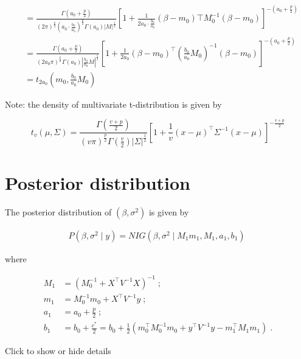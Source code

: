 \documentclass[
]{book}
\theoremstyle{definition}
\theoremstyle{definition}
\theoremstyle{definition}
\theoremstyle{definition}
\theoremstyle{remark}
\begin{document}
\begin{align}
& =\frac{\Gamma\left(a_{0}+\frac{p}{2}\right)}
{\left(2 \pi \right)^{\frac{p}{2}}\left(a_{0} \cdot \frac{b_{0}}{a_{0}}\right)^{\frac{p}{2}} \Gamma\left(a_{0}\right)|M|^{\frac{1}{2}}} \left[1+\frac{1}{2 a_{0} \cdot \frac{b_{0}}{a_{0}}} \left(\beta-m_{0}\right){\top} M_{0}^{-1}\left(\beta-m_{0}\right)\right]^{-\left(a_{0}+\frac{p}{2}\right)}\\
& =\frac{\Gamma\left(a_{0}+\frac{p}{2}\right)}{\left(2 a_{0} \pi\right)^{\frac{p}{2}} \Gamma\left(a_{0}\right)\left|\frac{b_{0}}{a_{0}} M\right|^{\frac{1}{2}}}\left[1+\frac{1}{2 a_{0}} \left(\beta-m_{0}\right)^{\top}\left(\frac{b_{0}}{a_{0}} M_{0}\right)^{-1}\left(\beta-m_{0}\right)\right]^{-\left(a_{0}+\frac{p}{2}\right)} \\
& =t_{2a_0}(m_0, \frac{b_0}{a_0}M_0) \;
\end{align}

Note: the density of multivariate t-distribution is given by

\[
t_v(\mu, \Sigma)=\frac{\Gamma\left(\frac{v+p}{2}\right)}{(v \pi)^{\frac{p}{2}} \Gamma\left(\frac{v}{2}\right)  |\Sigma|^{\frac{1}{2}}}\left[1+\frac{1}{v}(x-\mu)^{\top} \Sigma^{-1}(x-\mu)\right]^{-\frac{v+p}{2}}
\]

\hypertarget{posterior-distribution}{%
\section{Posterior distribution}\label{posterior-distribution}}

The posterior distribution of \((\beta, \sigma^2)\) is given by

\begin{align}
P\left(\beta, \sigma^{2} \mid y\right) = NIG\left(\beta, \sigma^{2} \mid M_{1}m_{1}, M_{1}, a_{1}, b_{1}\right) \;
\end{align}

where

\begin{align}
M_{1} &= (M_{0}^{-1}+X^{\top} V^{-1} X)^{-1} \;; \\
m_{1}&=M_{0}^{-1} m_{0}+X^{\top} V^{-1} y \;; \\
a_{1}&=a_{0}+\frac{p}{2} \;; \\
b_{1}&=b_{0}+\frac{c^{\ast}}{2}= b_{0}+\frac{1}{2}\left(m_{0}^{\top} M_{0}^{-1} m_{0}+y^{\top} V^{-1} y-m_{1}^{\top} M_{1} m_{1}\right)\;. 
\end{align}

Click to show or hide details
\end{document}
